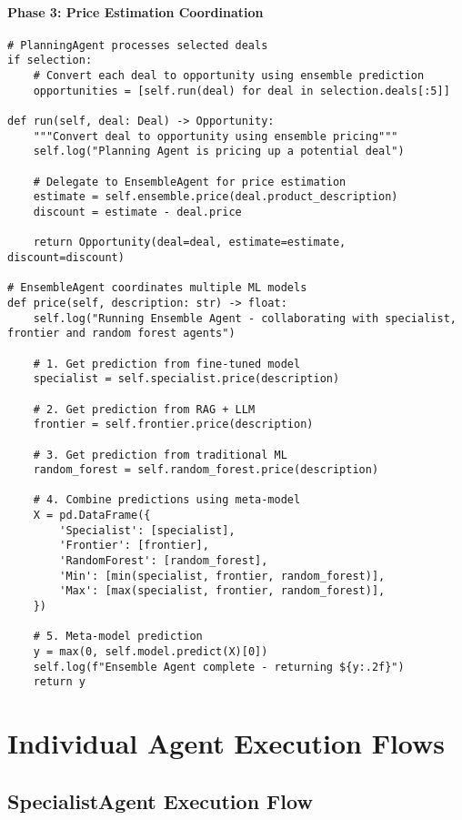\paragraph{Phase 3: Price Estimation Coordination}
\begin{lstlisting}[caption=Ensemble Price Prediction Workflow]
# PlanningAgent processes selected deals
if selection:
    # Convert each deal to opportunity using ensemble prediction
    opportunities = [self.run(deal) for deal in selection.deals[:5]]

def run(self, deal: Deal) -> Opportunity:
    """Convert deal to opportunity using ensemble pricing"""
    self.log("Planning Agent is pricing up a potential deal")
    
    # Delegate to EnsembleAgent for price estimation
    estimate = self.ensemble.price(deal.product_description)
    discount = estimate - deal.price
    
    return Opportunity(deal=deal, estimate=estimate, discount=discount)

# EnsembleAgent coordinates multiple ML models
def price(self, description: str) -> float:
    self.log("Running Ensemble Agent - collaborating with specialist, frontier and random forest agents")
    
    # 1. Get prediction from fine-tuned model
    specialist = self.specialist.price(description)
    
    # 2. Get prediction from RAG + LLM
    frontier = self.frontier.price(description)
    
    # 3. Get prediction from traditional ML
    random_forest = self.random_forest.price(description)
    
    # 4. Combine predictions using meta-model
    X = pd.DataFrame({
        'Specialist': [specialist],
        'Frontier': [frontier],
        'RandomForest': [random_forest],
        'Min': [min(specialist, frontier, random_forest)],
        'Max': [max(specialist, frontier, random_forest)],
    })
    
    # 5. Meta-model prediction
    y = max(0, self.model.predict(X)[0])
    self.log(f"Ensemble Agent complete - returning ${y:.2f}")
    return y
\end{lstlisting}

\section{Individual Agent Execution Flows}

\subsection{SpecialistAgent Execution Flow}

